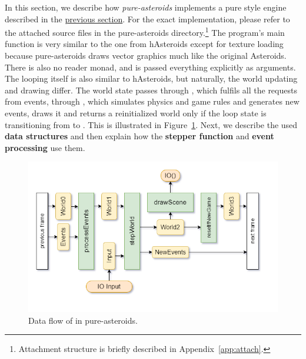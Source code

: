 \documentclass[
  digital, %
  color,   %
  table,   %
  oneside, %
  lof,     %
  lot,     %
]{fithesis3}
\begin{document}
\noindent In this section, we describe how \emph{pure-asteroids} implements a pure style engine described
in the \hyperref[sect:pureengines]{previous section}.
For the exact implementation, please refer to the attached source files
in the pure-asteroids directory.\footnote{
Attachment structure is briefly described in Appendix~\ref{app:attach}.}
The program's main function is very similar to the one from
hAsteroids except for texture loading because pure-asteroids
draws vector graphics much like the original Asteroids. There is also no reader monad,
and  is passed everything explicitly as arguments.
The looping itself is also similar to hAsteroids, but naturally,
the world updating and drawing differ. The world state passes through
, which fulfils all the requests from events,
through , which simulates physics and game rules and generates new events,
 draws it and  returns a reinitialized
world only if the loop state is transitioning from  to .
This is illustrated in Figure~\ref{fig:worldeventsflow}.
Next, we describe the used \textbf{data structures} and then explain
how the \textbf{stepper function} and \textbf{event processing} use them.
\begin{figure}[h]
    \centering
    \includegraphics[width=\textwidth]{images/world-flow-detailed.png}
    \caption{Data flow of  in pure-asteroids.}
    \label{fig:worldeventsflow}
\end{figure}
\end{document}
